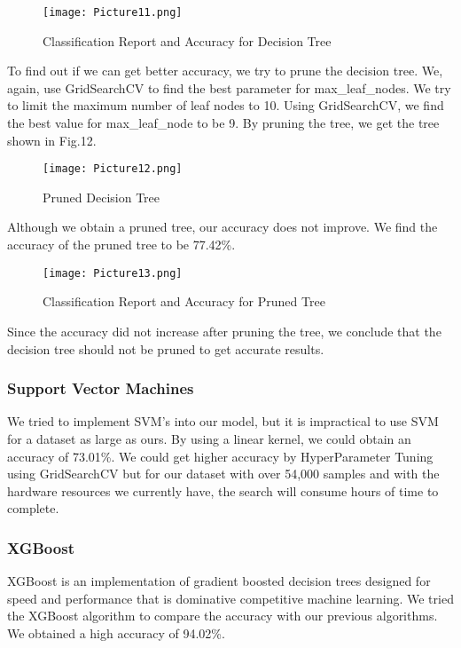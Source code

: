 \documentclass[11pt,conference]{IEEEtran}
\begin{document}
\begin{figure}[htbp]
\centerline{\texttt{[image: Picture11.png]}}
\caption{Classification Report and Accuracy for Decision Tree}
\label{fig}
\end{figure}

To find out if we can get better accuracy, we try to prune the decision tree. We, again, use GridSearchCV to find the best parameter for max\_leaf\_nodes. We try to limit the maximum number of leaf nodes to 10. Using GridSearchCV, we find the best value for max\_leaf\_node to be 9. By pruning the tree, we get the tree shown in Fig.12.

\begin{figure}[htbp]
\centerline{\texttt{[image: Picture12.png]}}
\caption{Pruned Decision Tree}
\label{fig}
\end{figure}

Although we obtain a pruned tree, our accuracy does not improve. We find the accuracy of the pruned tree to be 77.42\%.

\begin{figure}[htbp]
\centerline{\texttt{[image: Picture13.png]}}
\caption{Classification Report and Accuracy for Pruned Tree}
\label{fig}
\end{figure}

Since the accuracy did not increase after pruning the tree, we conclude that the decision tree should not be pruned to get accurate results.\\

\subsubsection{Support Vector Machines}
We tried to implement SVM’s into our model, but it is impractical to use SVM for a dataset as large as ours. By using a linear kernel, we could obtain an accuracy of 73.01\%. We could get higher accuracy by HyperParameter Tuning using GridSearchCV but for our dataset with over 54,000 samples and with the hardware resources we currently have, the search will consume hours of time to complete. \\

\subsubsection{XGBoost}
XGBoost is an implementation of gradient boosted decision trees designed for speed and performance that is dominative competitive machine learning. We tried the XGBoost algorithm to compare the accuracy with our previous algorithms. We obtained a high accuracy of 94.02\%.
\end{document}
